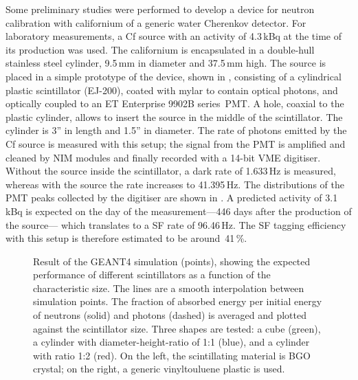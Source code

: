 Some preliminary studies were performed to develop a device for neutron calibration %
with californium of a generic water Cherenkov detector.
For laboratory measurements, a Cf source with an activity of 4.3\,kBq at the time of its production was used.
The californium is encapsulated in a double-hull stainless steel cylinder, 9.5\,mm in diameter and 37.5\,mm high.
The source is placed in a simple prototype of the device, shown in , %
consisting of a cylindrical plastic scintillator (EJ-200), coated with mylar to contain optical photons, %
and optically coupled to an ET Enterprise 9902B series~PMT.
A hole, coaxial to the plastic cylinder, allows to insert the source in the middle of the scintillator.
The cylinder is 3'' in length and 1.5'' in diameter.
The rate of photons emitted by the Cf source is measured with this setup; %
the signal from the PMT is amplified and cleaned by NIM modules and finally recorded with a 14-bit VME digitiser.
Without the source inside the scintillator, a dark rate of 1.633\,Hz is measured, %
whereas with the source the rate increases to 41.395\,Hz.
The distributions of the PMT peaks collected by the digitiser are shown in .
A predicted activity of 3.1\,kBq is expected on the day of the measurement---446 days after the production of the source--- %
which translates to a SF rate of 96.46\,Hz.
The SF tagging efficiency with this setup is therefore estimated to be around~41\,\%.

\begin{figure}
	\centering
	\resizebox{\textwidth}{!}{}
	\caption[Performance of different scintillators from the simulation of a neutron calibration device]%
	{Result of the GEANT4 simulation (points), showing the expected performance of different scintillators %
		as a function of the characteristic size.
		The lines are a smooth interpolation between simulation points.
		The fraction of absorbed energy per initial energy of neutrons (solid) and photons (dashed) %
		is averaged and plotted against the scintillator size.
		Three shapes are tested: a cube (green), a cylinder with diameter-height-ratio of 1:1 (blue), %
		and a cylinder with ratio 1:2 (red).
		On the left, the scintillating material is BGO crystal; on the right, %
		a generic vinyltouluene plastic is used.}
	\label{fig:geant4}
\end{figure}



